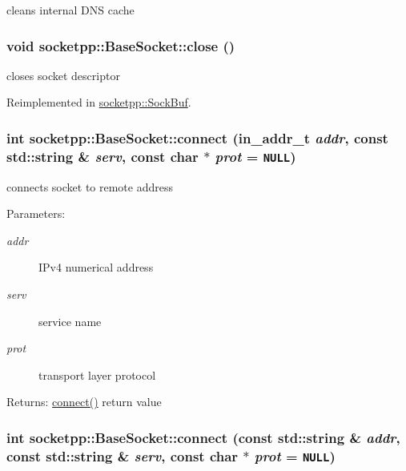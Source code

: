 cleans internal DNS cache 

\hypertarget{classsocketpp_1_1BaseSocket_f067195056bb6b5a65c4bc1d2ac7da72}{
\subsubsection[{close}]{\setlength{\rightskip}{0pt plus 5cm}void socketpp::BaseSocket::close ()}}
\label{classsocketpp_1_1BaseSocket_f067195056bb6b5a65c4bc1d2ac7da72}


closes socket descriptor 



Reimplemented in \hyperlink{classsocketpp_1_1SockBuf_28f88c6ac0570ee5e9d57e255733b0f9}{socketpp::SockBuf}.\hypertarget{classsocketpp_1_1BaseSocket_83666b030a93368675a842a992e0c2af}{
\subsubsection[{connect}]{\setlength{\rightskip}{0pt plus 5cm}int socketpp::BaseSocket::connect (in\_\-addr\_\-t {\em addr}, \/  const std::string \& {\em serv}, \/  const char $\ast$ {\em prot} = {\tt NULL})}}
\label{classsocketpp_1_1BaseSocket_83666b030a93368675a842a992e0c2af}


connects socket to remote address 

\begin{Desc}
\item[Parameters:]
\begin{description}
\item[{\em addr}]IPv4 numerical address \item[{\em serv}]service name \item[{\em prot}]transport layer protocol \end{description}
\end{Desc}
\begin{Desc}
\item[Returns:]\hyperlink{classsocketpp_1_1BaseSocket_769710192256606aaec1a776468d75fa}{connect()} return value \end{Desc}
\hypertarget{classsocketpp_1_1BaseSocket_eb0f4c84546c22fd9023169701d8fae8}{
\subsubsection[{connect}]{\setlength{\rightskip}{0pt plus 5cm}int socketpp::BaseSocket::connect (const std::string \& {\em addr}, \/  const std::string \& {\em serv}, \/  const char $\ast$ {\em prot} = {\tt NULL})}}
\label{classsocketpp_1_1BaseSocket_eb0f4c84546c22fd9023169701d8fae8}


